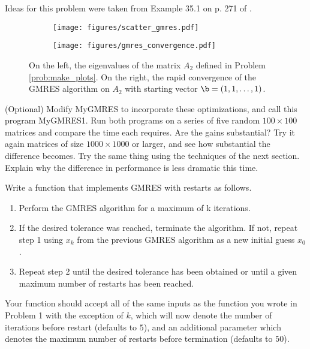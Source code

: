Ideas for this problem were taken from Example 35.1 on p. 271 of \cite{Trefethen1997}.

\begin{figure}[H] %
\captionsetup[subfigure]{justification=centering}
\centering
\begin{subfigure}{.49\textwidth}
    \centering
    \texttt{[image: figures/scatter\_gmres.pdf]}
\end{subfigure}
%
\begin{subfigure}{.49\textwidth}
    \centering
    \texttt{[image: figures/gmres\_convergence.pdf]}
\end{subfigure}
\caption{On the left, the eigenvalues of the matrix $A_2$ defined in Problem \ref{prob:make_plots}.
On the right, the rapid convergence of the GMRES algorithm on $A_2$ with starting vector $\b = (1, 1, \ldots, 1)$.}
\label{fig:plot_gmres}
\end{figure}

 \label{prob:GMRES2}
 (Optional) Modify MyGMRES to incorporate these optimizations, and call this program MyGMRES1.
 Run both programs on a series of five random $100\times 100$ matrices and compare the time each requires.
 Are the gains substantial?
 Try it again matrices of size $1000\times 1000$ or larger, and see how substantial the difference becomes.
 Try the same thing using the techniques of the next section.
 Explain why the difference in performance is less dramatic this time.
 
Write a function that implements GMRES with restarts as follows.
\begin{enumerate}
\item Perform the GMRES algorithm for a maximum of k iterations.
\item If the desired tolerance was reached, terminate the algorithm.
If not, repeat step 1 using $x_k$ from the previous GMRES algorithm as a new initial guess $x_0$.
\item Repeat step 2 until the desired tolerance has been obtained or until a given maximum number of restarts has been reached.
\end{enumerate}
Your function should accept all of the same inputs as the function you wrote in Problem 1 with the exception of $k$, which will now denote the number of iterations before restart (defaults to $5$), and an additional parameter  which denotes the maximum number of restarts before termination (defaults to $50$).
\label{prob:GMRESk}

